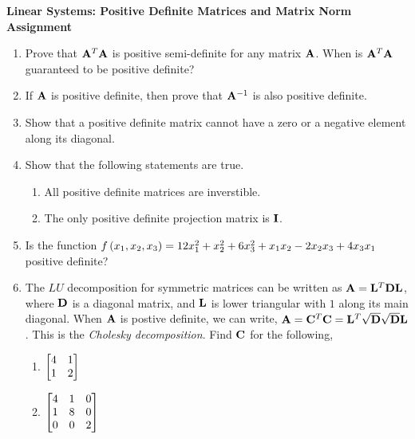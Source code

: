 \documentclass[9pt]{article}
\def\mf{\ensuremath\mathbf}
\def\lp{\ensuremath\left(}
\def\rp{\ensuremath\right)}
\def\bmx{\ensuremath\begin{bmatrix*}[r]}
\def\emx{\ensuremath\end{bmatrix*}}
\begin{document}
\begin{center}
\begin{Large}
\textbf{Linear Systems: Positive Definite Matrices and Matrix Norm Assignment}
\end{Large}
\end{center}
\vspace{0.2cm}

\begin{multicols}{2}

\begin{enumerate}
    \item Prove that $\mf{A}^T\mf{A}$ is positive semi-definite for any matrix $\mf{A}$. When is $\mf{A}^T\mf{A}$ guaranteed to be positive definite?

    \item If $\mf{A}$ is positive definite, then prove that $\mf{A}^{-1}$ is also positive definite.

    \item Show that a positive definite matrix cannot have a zero or a negative element along its diagonal.

    \item Show that the following statements are true.
        \begin{enumerate}
            \item All positive definite matrices are inverstible.
            \item The only positive definite projection matrix is $\mf{I}$.
        \end{enumerate}

    \item Is the function $f\lp x_1, x_2, x_3\rp = 12 x_1^2 + x_2^2 + 6x_3^2 + x_1x_2 - 2x_2x_3 + 4x_3x_1$ positive definite?

    \item The $LU$ decomposition for symmetric matrices can be written as $\mf{A} = \mf{L}^T\mf{D}\mf{L}$, where $\mf{D}$ is a diagonal matrix, and $\mf{L}$ is lower triangular with $1$ along its main diagonal. When $\mf{A}$ is postive definite, we can write, $\mf{A} = \mf{C}^T\mf{C} = \mf{L}^T\sqrt{\mf{D}}\sqrt{\mf{D}}\mf{L}$. This is the \textit{Cholesky decomposition}. Find $\mf{C}$ for the following,
    \begin{enumerate}
        \item $\bmx 4 & 1\\ 1 & 2\emx$
        \item $\bmx 4 & 1 & 0\\ 1 & 8 & 0\\0 & 0 & 2\emx$
    \end{enumerate}


\end{enumerate}
\end{multicols}
\end{document}
